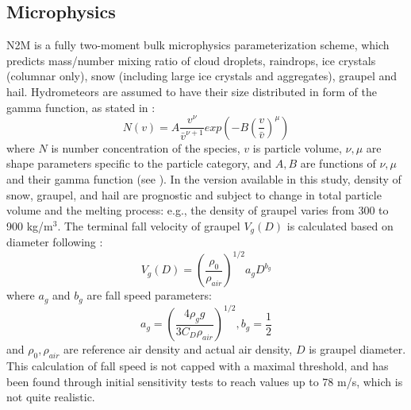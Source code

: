 \subsection{Microphysics}
N2M is a fully two-moment bulk microphysics parameterization scheme, which predicts mass/number mixing ratio of cloud droplets, raindrops, ice crystals (columnar only), snow (including large ice crystals and aggregates), graupel and hail. Hydrometeors are assumed to have their size distributed in form of the gamma function, as stated in \cite{mansell2010simulated}: 
\begin{equation}
    N(v) = 
    A\frac{v^{\nu}}{\bar{v}^{\nu+1}}
    exp \left(
    -B{( \frac{v}{\bar{v}} )}^\mu
    \right)
    \label{eq:gamma_dis}
\end{equation}
where $N$ is number concentration of the species, $v$ is particle volume, $\nu,\mu$ are shape parameters specific to the particle category, and $A,B$ are functions of $\nu,\mu$ and their gamma function (see \cite{mansell2010simulated}). 
In the version available in this study, density of snow, graupel, and hail are prognostic and subject to change in total particle volume and the melting process: e.g., the density of graupel varies from 300 to 900 kg/m$^3$. The terminal fall velocity of graupel $V_g(D)$ is calculated based on diameter following \cite{schoenberg1994double}:
\begin{equation}
    V_g(D) = 
    (\frac{\rho_0}{\rho_{air}})^{1/2} a_g D^{b_g}
    \label{eq:graupel_fall}
\end{equation}
where $a_g$ and $b_g$ are fall speed parameters:
\begin{equation}
    a_g = \left(
    \frac{4\rho_g g} {3C_D\rho_{air}}
    \right)^{1/2}
    , b_g=\frac{1}{2}
\end{equation}
and $\rho_0,\rho_{air}$ are reference air density and actual air density, $D$ is graupel diameter. This calculation of fall speed is not capped with a maximal threshold, and has been found through initial sensitivity tests to reach values up to 78 m/s, which is not quite realistic. 

